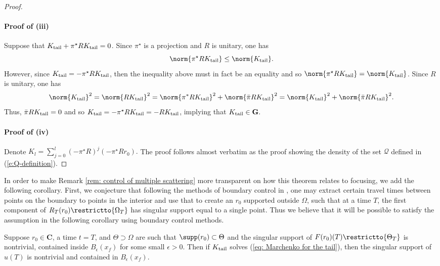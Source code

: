 \documentclass[10pt]{article}
\theoremstyle{plain}
\theoremstyle{definition}
\theoremstyle{remark}
\numberwithin{theorem}{section}
\numberwithin{example}{section}
\numberwithin{equation}{section}
\numberwithin{figure}{section}
\newcommand\tail{_{\textup{tail}}}
\begin{document}
\begin{proof}
\paragraph{Proof of (iii)}
Suppose that $K\tail + \pi^\star RK\tail = 0$. Since $\pi^\star$ is a projection and $R$ is unitary, one has
$$ \norm{\pi^\star RK\tail} \leq \norm{K\tail}.$$
However, since $K\tail = - \pi^\star RK\tail$, then the inequality above must in fact be an equality and so $\norm{\pi^\star RK\tail} = \norm{K\tail}$. Since $R$ is unitary, one has
$$\norm{K\tail}^2 = \norm{RK\tail}^2 = \norm{\pi^*RK\tail}^2 + \norm{\bar{\pi}RK\tail}^2 = \norm{K\tail}^2 + \norm{\bar{\pi}RK\tail}^2.$$
Thus, $\bar{\pi}RK\tail = 0$ and so
$ K\tail = -\pi^\star RK\tail = -RK\tail$, implying that $K\tail \in \mathbf{G}.$

\paragraph{Proof of (iv)}
Denote $K_l = \sum_{j=0}^l (-\pi^\star R)^j(-\pi^\star R r_0).$
The proof follows almost verbatim as the proof showing the density of the set $\mathcal Q$ defined in (\ref{e:Q-definition}).
\end{proof}

In order to make Remark \ref{rem: control of multiple scattering} more transparent on how this theorem relates to focusing, we add the following corollary. First, we conjecture that following the methods of boundary control in \cite{DKO}, one may extract certain travel times between points on the boundary to points in the interior and use that to create an $r_0$ supported outside $\Omega$, such that at a time $T$, the first component of $R_T(r_0)\restrictto{\Omega_T}$ has singular support equal to a single point. Thus we believe that it will be possible to satisfy the assumption in the following corollary using boundary control methods.

\begin{cor}
Suppose $r_0 \in \mathbf{C}$, a time $t=T$, and $\Theta\supset \Omega$ are such that $\supp(r_0) \subset \Theta$ and the singular support of $F(r_0)(T)\restrictto{\Theta_T}$ is nontrivial, contained inside $B_{\epsilon}(x_f)$ for some small $\epsilon>0$. Then if $K\tail$ solves (\ref{eq: Marchenko for the tail}), then the singular support of $u(T)$ is nontrivial and contained in $B_{\epsilon}(x_f)$.
\end{cor}
\end{document}

